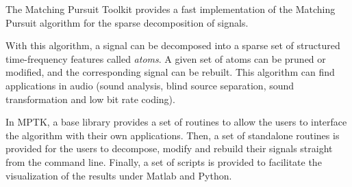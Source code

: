 The Matching Pursuit Toolkit provides a fast implementation of the Matching
Pursuit algorithm for the sparse decomposition of signals.

With this algorithm, a signal can be decomposed into a sparse set of
structured time-frequency features called {\em atoms}. A given set of atoms can
be pruned or modified, and the corresponding signal can be rebuilt. 
This algorithm can find applications in audio (sound analysis, blind source separation,
sound transformation and low bit rate coding).

In MPTK, a base library provides a set of routines to allow the
users to interface the algorithm with their own applications. Then, a set of
standalone routines is provided for the users to decompose, modify and rebuild
their signals straight from the command line. Finally, a set of scripts is
provided to facilitate the visualization of the results under Matlab and Python.
